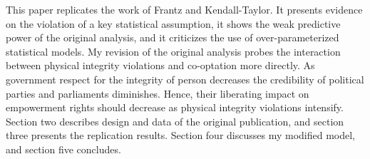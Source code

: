This paper replicates the work of Frantz and Kendall-Taylor.
It presents evidence on the violation of a key statistical 
assumption, it shows the weak predictive power of the 
original analysis, and it criticizes the use of 
over-parameterized statistical models. My revision
of the original analysis probes the interaction between 
physical integrity violations and co-optation more directly.
As government respect for the integrity of person decreases 
the credibility of political parties and parliaments 
diminishes. Hence, their liberating impact on empowerment 
rights should decrease as physical integrity violations 
intensify. Section two describes design and data of the 
original publication, and section three presents the 
replication results. Section four discusses my modified 
model, and section five concludes.